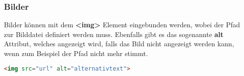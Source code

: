 \newpage
\subsubsection{Bilder}
Bilder können mit dem \textbf{<img>} Element eingebunden werden, wobei der Pfad zur Bilddatei definiert werden muss. Ebenfalls gibt es das sogenannte \textbf{alt} Attribut, welches angezeigt wird, falls das Bild nicht angezeigt werden kann, wenn zum Beispiel der Pfad nicht mehr stimmt.

\begin{lstlisting}[language=html]
    <img src="url" alt="alternativtext">
\end{lstlisting}




